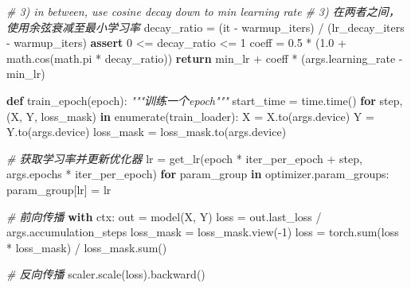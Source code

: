 \documentclass[
]{article}
\newenvironment{Shaded}{}{}
\newcommand{\BuiltInTok}[1]{\textcolor[rgb]{0.00,0.50,0.00}{#1}}
\newcommand{\CommentTok}[1]{\textcolor[rgb]{0.38,0.63,0.69}{\textit{#1}}}
\newcommand{\ControlFlowTok}[1]{\textcolor[rgb]{0.00,0.44,0.13}{\textbf{#1}}}
\newcommand{\DecValTok}[1]{\textcolor[rgb]{0.25,0.63,0.44}{#1}}
\newcommand{\FloatTok}[1]{\textcolor[rgb]{0.25,0.63,0.44}{#1}}
\newcommand{\KeywordTok}[1]{\textcolor[rgb]{0.00,0.44,0.13}{\textbf{#1}}}
\newcommand{\NormalTok}[1]{#1}
\newcommand{\OperatorTok}[1]{\textcolor[rgb]{0.40,0.40,0.40}{#1}}
\newcommand{\StringTok}[1]{\textcolor[rgb]{0.25,0.44,0.63}{#1}}
\begin{document}
\begin{Shaded}
\begin{Highlighting}[]
    \CommentTok{\# 3) in between, use cosine decay down to min learning rate}
    \CommentTok{\# 3) 在两者之间，使用余弦衰减至最小学习率}
\NormalTok{    decay\_ratio }\OperatorTok{=}\NormalTok{ (it }\OperatorTok{{-}}\NormalTok{ warmup\_iters) }\OperatorTok{/}\NormalTok{ (lr\_decay\_iters }\OperatorTok{{-}}\NormalTok{ warmup\_iters)}
    \ControlFlowTok{assert} \DecValTok{0} \OperatorTok{\textless{}=}\NormalTok{ decay\_ratio }\OperatorTok{\textless{}=} \DecValTok{1}
\NormalTok{    coeff }\OperatorTok{=} \FloatTok{0.5} \OperatorTok{*}\NormalTok{ (}\FloatTok{1.0} \OperatorTok{+}\NormalTok{ math.cos(math.pi }\OperatorTok{*}\NormalTok{ decay\_ratio))}
    \ControlFlowTok{return}\NormalTok{ min\_lr }\OperatorTok{+}\NormalTok{ coeff }\OperatorTok{*}\NormalTok{ (args.learning\_rate }\OperatorTok{{-}}\NormalTok{ min\_lr)}

\KeywordTok{def}\NormalTok{ train\_epoch(epoch):}
    \CommentTok{"""训练一个epoch"""}
\NormalTok{    start\_time }\OperatorTok{=}\NormalTok{ time.time()}
    \ControlFlowTok{for}\NormalTok{ step, (X, Y, loss\_mask) }\KeywordTok{in} \BuiltInTok{enumerate}\NormalTok{(train\_loader):}
\NormalTok{        X }\OperatorTok{=}\NormalTok{ X.to(args.device)}
\NormalTok{        Y }\OperatorTok{=}\NormalTok{ Y.to(args.device)}
\NormalTok{        loss\_mask }\OperatorTok{=}\NormalTok{ loss\_mask.to(args.device)}

        \CommentTok{\# 获取学习率并更新优化器}
\NormalTok{        lr }\OperatorTok{=}\NormalTok{ get\_lr(epoch }\OperatorTok{*}\NormalTok{ iter\_per\_epoch }\OperatorTok{+}\NormalTok{ step, args.epochs }\OperatorTok{*}\NormalTok{ iter\_per\_epoch)}
        \ControlFlowTok{for}\NormalTok{ param\_group }\KeywordTok{in}\NormalTok{ optimizer.param\_groups:}
\NormalTok{            param\_group[}\StringTok{\textquotesingle{}lr\textquotesingle{}}\NormalTok{] }\OperatorTok{=}\NormalTok{ lr}

        \CommentTok{\# 前向传播}
        \ControlFlowTok{with}\NormalTok{ ctx:}
\NormalTok{            out }\OperatorTok{=}\NormalTok{ model(X, Y)}
\NormalTok{            loss }\OperatorTok{=}\NormalTok{ out.last\_loss }\OperatorTok{/}\NormalTok{ args.accumulation\_steps}
\NormalTok{            loss\_mask }\OperatorTok{=}\NormalTok{ loss\_mask.view(}\OperatorTok{{-}}\DecValTok{1}\NormalTok{)}
\NormalTok{            loss }\OperatorTok{=}\NormalTok{ torch.}\BuiltInTok{sum}\NormalTok{(loss }\OperatorTok{*}\NormalTok{ loss\_mask) }\OperatorTok{/}\NormalTok{ loss\_mask.}\BuiltInTok{sum}\NormalTok{()}

        \CommentTok{\# 反向传播}
\NormalTok{        scaler.scale(loss).backward()}


\end{Highlighting}
\end{Shaded}
\end{document}
